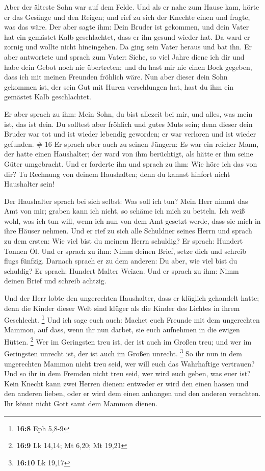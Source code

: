  Aber der älteste Sohn war auf dem Felde. Und als er nahe
zum Hause kam, hörte er das Gesänge und den Reigen;  und
rief zu sich der Knechte einen und fragte, was das wäre. 
Der aber sagte ihm: Dein Bruder ist gekommen, und dein Vater hat ein
gemästet Kalb geschlachtet, dass er ihn gesund wieder hat.
 Da ward er zornig und wollte nicht hineingehen. Da ging
sein Vater heraus und bat ihn.  Er aber antwortete und
sprach zum Vater: Siehe, so viel Jahre diene ich dir und habe dein Gebot
noch nie übertreten; und du hast mir nie einen Bock gegeben, dass ich
mit meinen Freunden fröhlich wäre.  Nun aber dieser dein
Sohn gekommen ist, der sein Gut mit Huren verschlungen hat, hast du ihm
ein gemästet Kalb geschlachtet.

 Er aber sprach zu ihm: Mein Sohn, du bist allezeit bei
mir, und alles, was mein ist, das ist dein.  Du solltest
aber fröhlich und gutes Muts sein; denn dieser dein Bruder war tot und
ist wieder lebendig geworden; er war verloren und ist wieder gefunden.
\# 16  Er sprach aber auch zu seinen Jüngern: Es war ein
reicher Mann, der hatte einen Haushalter; der ward von ihm berüchtigt,
als hätte er ihm seine Güter umgebracht.  Und er forderte
ihn und sprach zu ihm: Wie höre ich das von dir? Tu Rechnung von deinem
Haushalten; denn du kannst hinfort nicht Haushalter sein!

 Der Haushalter sprach bei sich selbst: Was soll ich tun?
Mein Herr nimmt das Amt von mir; graben kann ich nicht, so schäme ich
mich zu betteln.  Ich weiß wohl, was ich tun will, wenn
ich nun von dem Amt gesetzt werde, dass sie mich in ihre Häuser nehmen.
 Und er rief zu sich alle Schuldner seines Herrn und
sprach zu dem ersten: Wie viel bist du meinem Herrn schuldig?
 Er sprach: Hundert Tonnen Öl. Und er sprach zu ihm: Nimm
deinen Brief, setze dich und schreib flugs fünfzig. 
Darnach sprach er zu dem anderen: Du aber, wie viel bist du schuldig? Er
sprach: Hundert Malter Weizen. Und er sprach zu ihm: Nimm deinen Brief
und schreib achtzig.

 Und der Herr lobte den ungerechten Haushalter, dass er
klüglich gehandelt hatte; denn die Kinder dieser Welt sind klüger als
die Kinder des Lichtes in ihrem Geschlecht. \footnote{\textbf{16:8} Eph
  5,8-9}  Und ich sage euch auch: Machet euch Freunde mit
dem ungerechten Mammon, auf dass, wenn ihr nun darbet, sie euch
aufnehmen in die ewigen Hütten. \footnote{\textbf{16:9} Lk 14,14; Mt
  6,20; Mt 19,21}  Wer im Geringsten treu ist, der ist
auch im Großen treu; und wer im Geringsten unrecht ist, der ist auch im
Großen unrecht. \footnote{\textbf{16:10} Lk 19,17}  So
ihr nun in dem ungerechten Mammon nicht treu seid, wer will euch das
Wahrhaftige vertrauen?  Und so ihr in dem Fremden nicht
treu seid, wer wird euch geben, was euer ist?  Kein
Knecht kann zwei Herren dienen: entweder er wird den einen hassen und
den anderen lieben, oder er wird dem einen anhangen und den anderen
verachten. Ihr könnt nicht Gott samt dem Mammon dienen.

